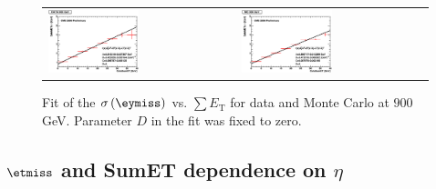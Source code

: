 \begin{figure}[h!]
 \centering
 \begin{tabular}{ll}
  \includegraphics[width=0.5\textwidth]{plots_DataVsMC_MB_900GeV/final_metysigma_sumet_DATA_900.eps} &
  \includegraphics[width=0.5\textwidth]{plots_DataVsMC_MB_900GeV/final_metysigma_sumet_MC_900.eps} \\
 \end{tabular}
 \caption{\small Fit of the $\sigma\left(\eymiss\right)$ vs. $\sum E_\text{T}$ for data and Monte Carlo at $900$ GeV. Parameter $D$ in the fit was fixed
          to zero.\label{fig:MEySigma_vs_SumET_900_fit}}
\end{figure}


\clearpage

\subsection{$\etmiss$ and SumET dependence on $\eta$}

